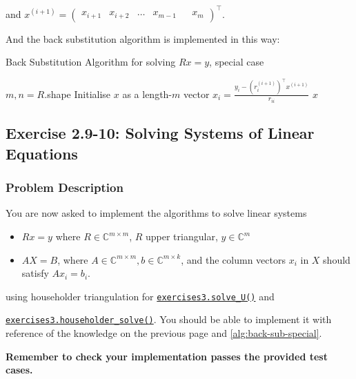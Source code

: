 \noindent and $x^{(i + 1)} = \begin{pmatrix} x_{i + 1} & x_{i + 2} & \ldots & x_{m - 1} && x_{m} \end{pmatrix}^{\top} $. \medskip

\noindent And the back substitution algorithm is implemented in this way:

\begin{algorithm}[H]
  \caption{Back Substitution Algorithm for solving \(Rx = y\), special case}
  \label{alg:back-sub-special}
  \begin{algorithmic}[1]
  \State $m, n = R$.shape
  \State Initialise \(x\) as a length-\(m\) vector  
    \State \(x_{i} = \frac{y_i - (r_i^{(i + 1)})^{\top}x^{(i + 1)}}{r_{ii}}\)  
  \EndFor
    \State \Return \(x\) 
  \EndProcedure
  \end{algorithmic}
\end{algorithm}
\subsection*{Exercise 2.9-10: Solving Systems of Linear Equations}
\subsubsection*{Problem Description}%
You are now asked to implement the algorithms to solve linear systems
\begin{itemize}
  \item \(Rx = y\)  where \(R \in \mathbb{C}^{m \times m}\), \(R\)  upper triangular, \(y \in \mathbb{C}^{m}\)     
  \item \(AX = B\), where \(A \in \mathbb{C}^{m \times m}, b \in \mathbb{C}^{m \times k}\), and the column vectors \(x_i\) in \(X\) should satisfy \(A x_i = b_i\).
\end{itemize}
using householder triangulation for \href{https://comp-lin-alg.github.io/cla_utils.html#cla_utils.exercises3.solve_U}{\texttt{exercises3.solve\_U()}} and 

\noindent \href{https://comp-lin-alg.github.io/cla_utils.html#cla_utils.exercises3.householder_solve}{\texttt{exercises3.householder\_solve()}}. You should be able to implement it with reference of the knowledge on the previous page and \autoref{alg:back-sub-special}. \medskip

\noindent \textbf{Remember to check your implementation passes the provided test cases.} \medskip

